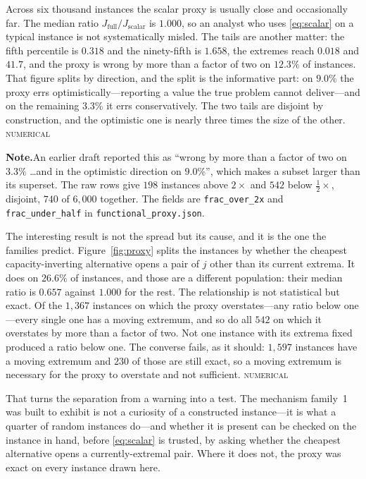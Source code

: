 \documentclass[conference]{IEEEtran}
\theoremstyle{definition}
\newcommand{\NUM}{\textsc{numerical}}
\newif\ifshownotes\shownotestrue
\newcommand{\NOTEPAR}[1]{\ifshownotes\par\vspace{2pt}\noindent%
  {\color{notecol}\textsf{\footnotesize\textbf{Note.}\;#1}}\par\vspace{2pt}\fi}
\begin{document}
Across six thousand instances the scalar proxy is usually close and occasionally far. The
median ratio $J_{\mathrm{full}}/J_{\mathrm{scalar}}$ is $1.000$, so an analyst who uses
\eqref{eq:scalar} on a typical instance is not systematically misled. The tails are another
matter: the fifth percentile is $0.318$ and the ninety-fifth is $1.658$, the extremes reach
$0.018$ and $41.7$, and the proxy is wrong by more than a factor of two on $12.3\%$ of
instances. That figure splits by direction, and the split is the informative part: on
$9.0\%$ the proxy errs optimistically---reporting a value the true problem cannot
deliver---and on the remaining $3.3\%$ it errs conservatively. The two tails are disjoint by
construction, and the optimistic one is nearly three times the size of the other. \NUM{}
\NOTEPAR{An earlier draft reported this as ``wrong by more than a factor of two on
$3.3\%$ \dots and in the optimistic direction on $9.0\%$'', which makes a subset larger than
its superset. The raw rows give $198$ instances above $2\times$ and $542$ below $\tfrac12
\times$, disjoint, $740$ of $6{,}000$ together. The fields are \texttt{frac\_over\_2x} and
\texttt{frac\_under\_half} in \texttt{functional\_proxy.json}.}

The interesting result is not the spread but its cause, and it is the one the families
predict. Figure~\ref{fig:proxy} splits the instances by whether the cheapest
capacity-inverting alternative opens a pair of $j$ other than its current extrema. It does on
$26.6\%$ of instances, and those are a different population: their median ratio is $0.657$
against $1.000$ for the rest. The relationship is not statistical but exact. Of the $1{,}367$
instances on which the proxy overstates---any ratio below one---every single one has a moving
extremum, and so do all $542$ on which it overstates by more than a factor of two. Not one
instance with its extrema fixed produced a ratio below one. The converse fails, as it should:
$1{,}597$ instances have a moving extremum and $230$ of those are still exact, so a moving
extremum is necessary for the proxy to overstate and not sufficient. \NUM{}

That turns the separation from a warning into a test. The mechanism family~1 was built to
exhibit is not a curiosity of a constructed instance---it is what a quarter of random
instances do---and whether it is present can be checked on the instance in hand, before
\eqref{eq:scalar} is trusted, by asking whether the cheapest alternative opens a
currently-extremal pair. Where it does not, the proxy was exact on every instance drawn here.
\end{document}

